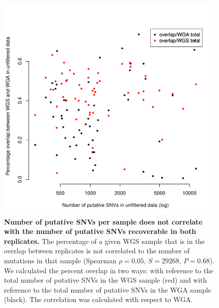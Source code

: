 \documentclass[11 pt]{article} %
\begin{document}
\begin{figure}
\centerline{
\includegraphics[width=5in]{Figure3.pdf} }
\caption{\textbf{Number of putative SNVs per sample does not correlate with the number of putative SNVs recoverable in both replicates.} The percentage of a given WGS sample that is in the overlap between replicates is not correlated to the number of mutations in that sample (Spearman $\rho=0.05$, $S=29268$, $P=0.68$). We calculated the percent overlap in two ways: with reference to the total number of putative SNVs in the WGS sample (red) and with reference to the total number of putative SNVs in the WGA sample (black). The correlation was calculated with respect to WGA.}
\label{fig:unfiltered_total_muts}
\end{figure}
\end{document}
